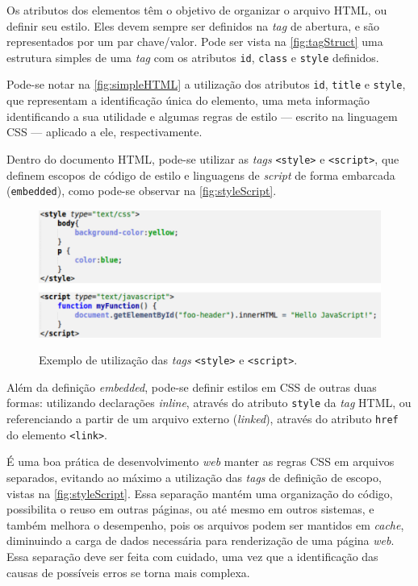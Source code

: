 Os atributos dos elementos têm o objetivo de organizar o arquivo HTML, ou definir seu estilo. Eles devem sempre ser definidos na \textit{tag} de abertura, e são representados por um par chave/valor. Pode ser vista na \autoref{fig:tagStruct} uma estrutura simples de uma \textit{tag} com os atributos \texttt{id}, \texttt{class} e \texttt{style} definidos.

Pode-se notar na \autoref{fig:simpleHTML} a utilização dos atributos \texttt{id}, \texttt{title} e \texttt{style}, que representam a identificação única do elemento, uma meta informação identificando a sua utilidade e algumas regras de estilo --- escrito na linguagem CSS --- aplicado a ele, respectivamente.

Dentro do documento HTML, pode-se utilizar as \textit{tags} \texttt{<style>} e \texttt{<script>}, que definem escopos de código de estilo e linguagens de \textit{script} de forma embarcada (\texttt{embedded}), como pode-se observar na \autoref{fig:styleScript}.

\begin{figure}[!htb]
	\centering
	\caption{Exemplo de utilização das \textit{tags} \texttt{<style>} e \texttt{<script>}.}
	\includegraphics[width=1\textwidth]{./04-figuras/style_script}
	\label{fig:styleScript}
\end{figure}

Além da definição \textit{embedded}, pode-se definir estilos em CSS de outras duas formas: utilizando declarações \textit{inline}, através do atributo \texttt{style} da \textit{tag} HTML, ou referenciando a partir de um arquivo externo (\textit{linked}), através do atributo \texttt{href} do elemento \texttt{<link>}. 

É uma boa prática de desenvolvimento \textit{web} manter as regras CSS em arquivos separados, evitando ao máximo a utilização das \textit{tags} de definição de escopo, vistas na \autoref{fig:styleScript}. Essa separação mantém uma organização do código, possibilita o reuso em outras páginas, ou até mesmo em outros sistemas, e também melhora o desempenho, pois os arquivos podem ser mantidos em \textit{cache}, diminuindo a carga de dados necessária para renderização de uma página \textit{web}. Essa separação deve ser feita com cuidado, uma vez que a identificação das causas de possíveis erros se torna mais complexa.


